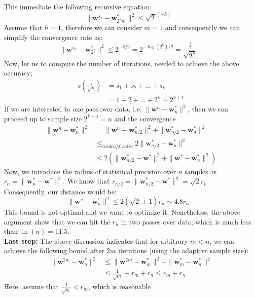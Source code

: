 \documentclass[11pt, a4paper, reqno, twoside]{scrartcl}
\theoremstyle{style}
\newcommand{\wv}{\bm{w}}
\newcommand{\0}{\mathbf{0}} %
\begin{document}
This immediate the following recursive equation: 
\begin{equation*}
	\|\wv^{s_k} - \wv_{2^k m}^*\|^2 \leq \sqrt{2}^{(-k)}
\end{equation*}
Assume that $h=1$, therefore we can consider $m=1$ and consequently we can
simplify the convergence rate as: 
\begin{equation}
	\|\wv^{s_k} - \wv_{2^k }^*\|^2 \leq 2^{-k/2} = 2^{-\log(2^k)/2} =
	\frac{1}{\sqrt{2^k}}
\end{equation}
Now, let us to compute the number of iterations, needed to achieve the above
accuracy; 
\begin{eqnarray*}
	& s(\frac{1}{\sqrt{k}}) &= s_1 + s_2 + \ldots + s_k \\ 
	& & = 1 + 2 + \ldots + 2^k \sim 2^{k+1}
\end{eqnarray*}
If we are interested to one pass over data, i.e. $\| \wv^n - \wv^*_n\|^2$, then
we can proceed up to sample size $2^{k+1} = n$ and the convergence  
\begin{eqnarray*}
	& \|\wv^{n} - \wv^*_{n}\|^2  & = \|\wv^{n} - \wv_{n/2}^*\|^2 + \|\wv_{n/2}^* -
	\wv_{n}^*\|^2 \\ 
	& & \leq_{\textit{tradeoff ratio}} 2 \|\wv_{n/2}^* -
	\wv_{n}^*\|^2 \\
	& & \leq  2( \|\wv_{n/2}^* -
	\wv^*\|^2 + \| \wv^* - \wv_{n}^* \|^2)
\end{eqnarray*}
Now, we introduce the radius of statistical precision over $n$ samples as 
$r_n = \|\wv_{n}^* - \wv^*\|^2$. We know that $r_{n/2} = \|\wv_{n/2}^* -
\wv^*\|^2 = \sqrt{2} r_n$. Consequently, our distance would be: 
\begin{equation*}
	\|\wv^n - \wv_n^* \|^2 \leq 2(\sqrt{2} + 1) r_n \sim 4.8 r_n
\end{equation*}
This bound is not optimal and we want to optimize it.
Nonetheless, the above argument show that we can hit the $r_n$ in two passes
over data, which is much less than $\ln(n) = 11.5$. 
\\
\textbf{Last step:} 
The above discussion indicates that for arbitrary $m<n$, we can 
achieve the following bound after $2m$ iterations (using the adaptive sample
size):
\begin{eqnarray*}
	& \| \wv^{2m} - \wv^*_n \|^2 & \leq \|\wv^{2m} - \wv^*_m\|^2 + \| \wv^*_m -
	\wv^*_n \|^2 \\
	 & & \leq \frac{1}{\sqrt{m}} + r_m + r_n \leq r_m + r_n
\end{eqnarray*}
Here, assume that $\frac{1}{\sqrt{m}} < r_m$, which is reasonable
\end{document}

